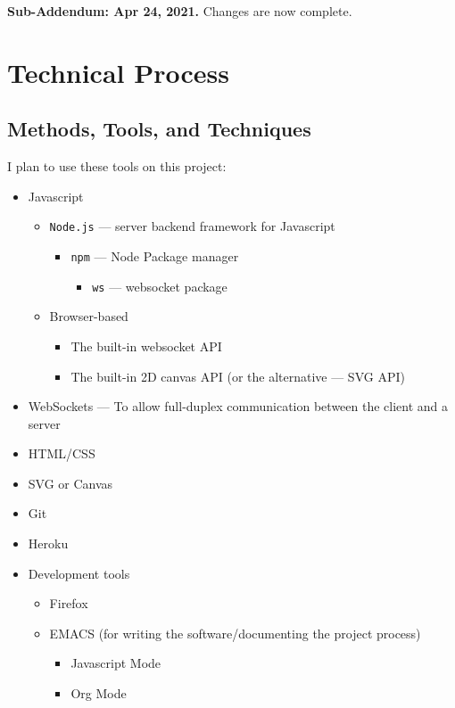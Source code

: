 \documentclass[11pt]{article}
\begin{document}
\textbf{Sub-Addendum: Apr 24, 2021.}
Changes are now complete. 
\section{Technical Process}
\label{sec:org98634b3}
\subsection{Methods, Tools, and Techniques}
\label{sec:orge79e926}
I plan to use these tools on this project:
\begin{itemize}
\item Javascript
\begin{itemize}
\item \texttt{Node.js} --- server backend framework for Javascript
\begin{itemize}
\item \texttt{npm} --- Node Package manager
\begin{itemize}
\item \texttt{ws} --- websocket package
\end{itemize}
\end{itemize}
\item Browser-based
\begin{itemize}
\item The built-in websocket API
\item The built-in 2D canvas API (or the alternative --- SVG API)
\end{itemize}
\end{itemize}
\item WebSockets --- To allow full-duplex communication between the client and a server
\item HTML/CSS
\item SVG or Canvas
\item Git
\item Heroku
\item Development tools
\begin{itemize}
\item Firefox
\item EMACS (for writing the software/documenting the project process)
\begin{itemize}
\item Javascript Mode
\item Org Mode
\end{itemize}
\end{itemize}
\end{itemize}
\end{document}
